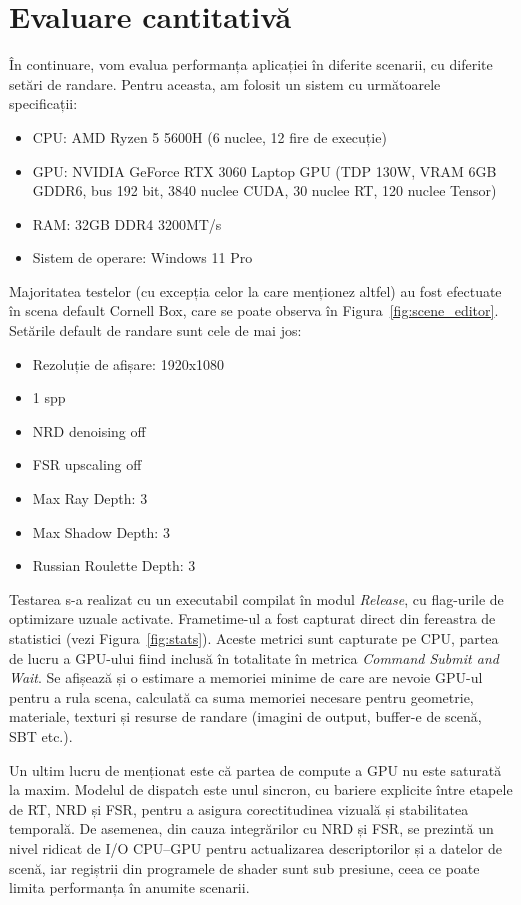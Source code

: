 \documentclass[12pt,a4paper]{report}
\numberwithin{equation}{section} %
\begin{document}
\section{Evaluare cantitativă}

În continuare, vom evalua performanța aplicației în diferite scenarii, cu diferite setări de randare.
Pentru aceasta, am folosit un sistem cu următoarele specificații:

\begin{itemize}
    \item CPU: AMD Ryzen 5 5600H (6 nuclee, 12 fire de execuție)
    \item GPU: NVIDIA GeForce RTX 3060 Laptop GPU (TDP 130W, VRAM 6GB GDDR6, bus 192 bit, 3840 nuclee CUDA, 30 nuclee RT, 120 nuclee Tensor)
    \item RAM: 32GB DDR4 3200MT/s
    \item Sistem de operare: Windows 11 Pro
\end{itemize}

Majoritatea testelor (cu excepția celor la care menționez altfel) au fost efectuate în scena default Cornell Box, care se poate observa în Figura~\ref{fig:scene_editor}.
Setările default de randare sunt cele de mai jos:
\begin{itemize}
    \item Rezoluție de afișare: 1920x1080
    \item 1 spp
    \item NRD denoising off
    \item FSR upscaling off
    \item Max Ray Depth: 3
    \item Max Shadow Depth: 3
    \item Russian Roulette Depth: 3
\end{itemize}

Testarea s-a realizat cu un executabil compilat în modul \textit{Release}, cu flag-urile de optimizare uzuale activate.
Frametime-ul a fost capturat direct din fereastra de statistici (vezi Figura~\ref{fig:stats}).
Aceste metrici sunt capturate pe CPU, partea de lucru a GPU-ului fiind inclusă în totalitate în metrica \textit{Command Submit and Wait}.
Se afișează și o estimare a memoriei minime de care are nevoie GPU-ul pentru a rula scena, calculată ca suma memoriei necesare pentru geometrie, materiale, texturi și resurse de randare (imagini de output, buffer-e de scenă, SBT etc.).

Un ultim lucru de menționat este că partea de compute a GPU nu este saturată la maxim.
Modelul de dispatch este unul sincron, cu bariere explicite între etapele de RT, NRD și FSR, pentru a asigura corectitudinea vizuală și stabilitatea temporală.
De asemenea, din cauza integrărilor cu NRD și FSR, se prezintă un nivel ridicat de I/O CPU--GPU pentru actualizarea descriptorilor și a datelor de scenă, iar regiștrii din programele de shader sunt sub presiune, ceea ce poate limita performanța în anumite scenarii.
\end{document}
